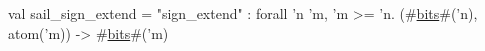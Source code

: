 val sail_sign_extend = "sign_extend" : forall 'n 'm, 'm >= 'n. (#\hyperref[zbits]{bits}#('n), atom('m)) -> #\hyperref[zbits]{bits}#('m)
